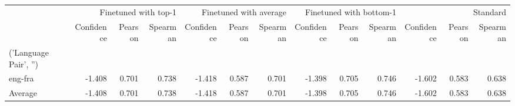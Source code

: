 \begin{tabular}{lrrrrrrrrrrrr}
\toprule
 & \multicolumn{3}{r}{Finetuned with top-1} & \multicolumn{3}{r}{Finetuned with average} & \multicolumn{3}{r}{Finetuned with bottom-1} & \multicolumn{3}{r}{Standard} \\
 & Confidence & Pearson & Spearman & Confidence & Pearson & Spearman & Confidence & Pearson & Spearman & Confidence & Pearson & Spearman \\
('Language Pair', '') &  &  &  &  &  &  &  &  &  &  &  &  \\
\midrule
eng-fra & -1.408 & 0.701 & 0.738 & -1.418 & 0.587 & 0.701 & -1.398 & 0.705 & 0.746 & -1.602 & 0.583 & 0.638 \\
Average & -1.408 & 0.701 & 0.738 & -1.418 & 0.587 & 0.701 & -1.398 & 0.705 & 0.746 & -1.602 & 0.583 & 0.638 \\
\bottomrule
\end{tabular}
